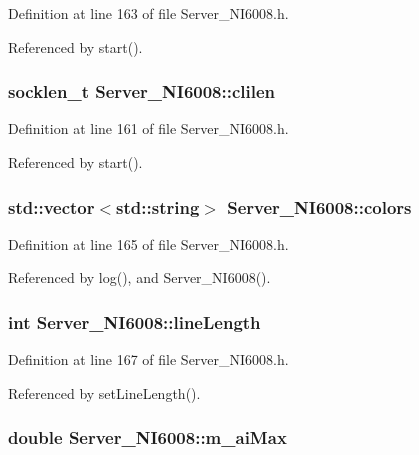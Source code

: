 Definition at line 163 of file Server\_\-NI6008.h.

Referenced by start().\hypertarget{classServer__NI6008_a7870880eba646269208e0c75de3e63bc}{
\subsubsection[{clilen}]{\setlength{\rightskip}{0pt plus 5cm}socklen\_\-t {\bf Server\_\-NI6008::clilen}}}
\label{classServer__NI6008_a7870880eba646269208e0c75de3e63bc}


Definition at line 161 of file Server\_\-NI6008.h.

Referenced by start().\hypertarget{classServer__NI6008_a79fecc3f96756f6a519785663bb11d07}{
\subsubsection[{colors}]{\setlength{\rightskip}{0pt plus 5cm}std::vector$<$std::string$>$ {\bf Server\_\-NI6008::colors}}}
\label{classServer__NI6008_a79fecc3f96756f6a519785663bb11d07}


Definition at line 165 of file Server\_\-NI6008.h.

Referenced by log(), and Server\_\-NI6008().\hypertarget{classServer__NI6008_a88ff64de4d8715d849b06c2457d13e17}{
\subsubsection[{lineLength}]{\setlength{\rightskip}{0pt plus 5cm}int {\bf Server\_\-NI6008::lineLength}}}
\label{classServer__NI6008_a88ff64de4d8715d849b06c2457d13e17}


Definition at line 167 of file Server\_\-NI6008.h.

Referenced by setLineLength().\hypertarget{classServer__NI6008_aa871878e7792bd5dc002f64ef7575dd4}{
\subsubsection[{m\_\-aiMax}]{\setlength{\rightskip}{0pt plus 5cm}double {\bf Server\_\-NI6008::m\_\-aiMax}}}
\label{classServer__NI6008_aa871878e7792bd5dc002f64ef7575dd4}


